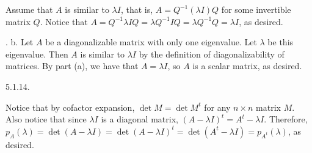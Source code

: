 Assume that $A$ is similar to $\lambda I$, that is,
$A = Q^{-1} (\lambda I) Q$ for some invertible matrix $Q$.
Notice that $A = Q^{-1} \lambda I Q = \lambda Q^{-1} I Q =
\lambda Q^{-1} Q = \lambda I$, as desired.
\medskip
\item. b.
Let $A$ be a diagonalizable matrix with only one eigenvalue.
Let $\lambda$ be this eigenvalue.
Then $A$ is similar to $\lambda I$
by the definition of diagonalizability of matrices.
By part (a), we have that $A = \lambda I$,
so $A$ is a scalar matrix, as desired.
\bigskip
\item{5.1.14.}

Notice that by cofactor expansion,
$\det M = \det M^t$ for any $n \times n$ matrix $M$.
Also notice that since $\lambda I$ is a diagonal matrix,
$(A - \lambda I)^t = A^t - \lambda I$.
Therefore, $p_A(\lambda) = \det (A - \lambda I) =
\det (A - \lambda I)^t = \det (A^t - \lambda I) =
p_{A^t}(\lambda)$, as desired.
\bye
